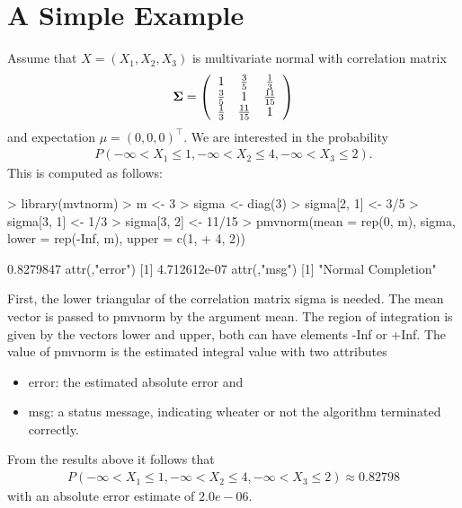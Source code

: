 \documentclass[11pt]{amsart}
\newcommand{\Sig}{\mbox{\boldmath $\Sigma$}}
\begin{document}
\section{A Simple Example \label{simple}}

Assume that $ X = (X_1, X_2, X_3) $ is multivariate normal with correlation
matrix
\begin{eqnarray*}
\Sig = \left( \begin{array}{ccc} 1 & \frac{3}{5} & \frac{1}{3} \\
\frac{3}{5} & 1 & \frac{11}{15} \\
\frac{1}{3} & \frac{11}{15} & 1 \end{array} \right)
\end{eqnarray*}
and expectation $ \mu = (0,0,0)^{\top} $. We are interested in the probability
\begin{eqnarray*}
P(-\infty < X_1 \le 1, -\infty < X_2 \le 4, -\infty < X_3 \le 2).
\end{eqnarray*}
This is computed as follows:
\begin{Schunk}
\begin{Sinput}
> library(mvtnorm)
> m <- 3
> sigma <- diag(3)
> sigma[2, 1] <- 3/5
> sigma[3, 1] <- 1/3
> sigma[3, 2] <- 11/15
> pmvnorm(mean = rep(0, m), sigma, lower = rep(-Inf, m), upper = c(1, 
+     4, 2))
\end{Sinput}
\begin{Soutput}
[1] 0.8279847
attr(,"error")
[1] 4.712612e-07
attr(,"msg")
[1] "Normal Completion"
\end{Soutput}
\end{Schunk}
First, the lower triangular of the correlation matrix {\ttfamily sigma}
is needed. The mean
vector is passed to {\ttfamily pmvnorm} by the argument {\ttfamily mean}.
The region of
integration is given by the vectors {\ttfamily lower} and {\ttfamily upper},
both can have elements {\ttfamily -Inf} or {\ttfamily +Inf}. The value of {\ttfamily pmvnorm}
is the estimated integral value with two attributes 
\begin{itemize}
\item {\ttfamily error}: the estimated absolute error and
\item {\ttfamily msg}: a status message, indicating wheater or not the algorithm
terminated correctly.
\end{itemize}
From the results above it follows that
\begin{eqnarray*}
P(-\infty < X_1 \le 1, -\infty < X_2 \le 4, -\infty < X_3 \le 2) \approx
0.82798
\end{eqnarray*}
with an absolute error estimate of $2.0e-06$.
\end{document}
